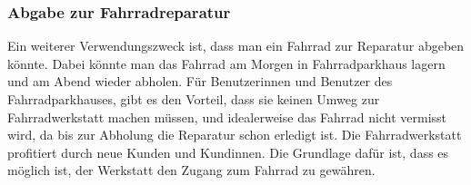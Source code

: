 \subsubsection{Abgabe zur Fahrradreparatur}
Ein weiterer Verwendungszweck ist, dass man ein Fahrrad zur Reparatur abgeben könnte. Dabei könnte man das Fahrrad am Morgen in Fahrradparkhaus lagern und am Abend wieder abholen. Für Benutzerinnen und Benutzer des Fahrradparkhauses, gibt es den Vorteil, dass sie keinen Umweg zur Fahrradwerkstatt machen müssen, und idealerweise das Fahrrad nicht vermisst wird, da bis zur Abholung die Reparatur schon erledigt ist. Die Fahrradwerkstatt profitiert durch neue Kunden und Kundinnen. Die Grundlage dafür ist, dass es möglich ist, der Werkstatt den Zugang zum Fahrrad zu gewähren.